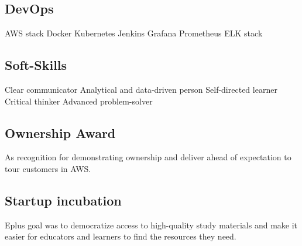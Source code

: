 \documentclass[a4paper]{my_cv}
\begin{document}
\begin{minipage}[t]{0.33\textwidth}
\subsection{DevOps}
AWS stack \textbullet{} Docker \textbullet{} Kubernetes \textbullet{} Jenkins \textbullet{} Grafana \textbullet{} Prometheus \textbullet{}  ELK stack
\sectionsep

\subsection{Soft-Skills}
Clear communicator \textbullet{} Analytical and data-driven person \textbullet{} Self-directed learner \textbullet{} Critical thinker \textbullet{}  Advanced problem-solver 
\sectionsep


\subsection{Ownership Award}
\vspace{\topsep} %
As recognition for demonstrating ownership and deliver ahead of expectation to tour customers in AWS.
\sectionsep

\subsection{Startup incubation}
\vspace{\topsep} %
Eplus goal was to democratize access to high-quality study materials and make it easier for educators and learners to find the resources they need.
\sectionsep

\end{minipage} 
\hfill
\end{document}
